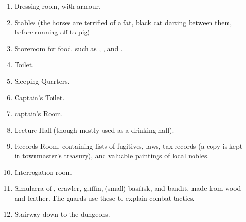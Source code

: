 \begin{multicols}{2}
\begin{enumerate}
  \item
  Dressing room, with armour.
  \label{stationDressing}
  \item
  Stables\label{stationStables} (the horses are terrified of a fat, black cat darting between them, before running off to \gls{pig}).
  \item
  Storeroom for food, such as \rations, \rations, and \rations.
  \label{stationStorage}
  \item
  Toilet.
  \label{stationToilet}
  \item
  Sleeping Quarters.
  \label{stationSleep}
  \item
  Captain's Toilet.
  \label{stationCaptainToilet}
  \item
  \gls{captain}'s Room.
  \label{stationCaptainRoom}
  \item
  Lecture Hall (though mostly used as a drinking hall).
  \label{stationLecture}
  \item
  Records Room, containing lists of fugitives, laws, tax records (a copy is kept in \gls{townmaster}'s treasury), and valuable paintings of local nobles.
  \label{stationRecords}
  \item
  Interrogation room.
  \label{stationInterrogation}
  \item
    Simulacra of , \gls{crawler}, griffin, (small) \gls{basilisk}, and bandit, made from wood and leather.
  The guards use these to explain combat tactics.
  \label{stationShrine}
  \item
  Stairway down to the dungeons.
  \label{stationStairs}
\end{enumerate}

\end{multicols}

